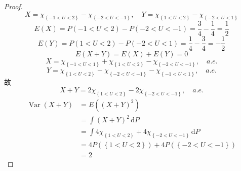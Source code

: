 \documentclass[../main.tex]{subfiles}
\begin{document}
\begin{proof}
  \[
  X=\chi _{\left\{ -1< U< 2 \right\}}- \chi _{\left\{ -2< U< -1 \right\}},\quad Y= \chi _{\left\{ 1< U< 2 \right\}}-\chi _{\left\{ -2< U< 1 \right\}}
  \]   \[
  E\left( X \right)=  P\left( -1< U< 2 \right)-P\left( -2< U< -1 \right)= \frac{3 }{4 }-\frac{1 }{4 }= \frac{1}{2}    
  \] \[
  E\left( Y \right)= P\left( 1< U< 2 \right)-P\left( -2< U< 1 \right)= \frac{1}{4}-\frac{3}{4}= -\frac{1}{2}   
  \]\[
  E\left( X+ Y \right)= E\left( X \right)+ E\left( Y \right)=    0
  \]\[
  X= \chi _{\left\{ -1< U< 1 \right\}}+ \chi _{\left\{ 1< U< 2 \right\}}-\chi _{\left\{ -2< U< -1 \right\}}, \quad a.e.
  \] \[
  Y= \chi _{\left\{ 1< U< 2 \right\}}-\chi_{\left\{ -2< U< -1 \right\}}- \chi _{\left\{ -1< U< 1 \right\}},\quad a.e.
  \] 故 \[
  X+ Y= 2\chi _{\left\{ 1< U< 2 \right\}}-2\chi _{\left\{ -2< U< -1 \right\}},\quad a.e.
  \]\[
  \begin{aligned}
  \operatorname{Var}\left( X+ Y \right)&=  E\left( \left( X+ Y \right)^{2} \right)\\ 
   &=   \int \left( X+ Y \right)^{2}\,\mathrm{d} P\\ 
    &= \int  4\chi _{\left\{ 1< U< 2 \right\}}+ 4\chi _{\left\{ -2< U< -1 \right\}}\,\mathrm{d} P\\ 
     &= 4P\left( \left\{ 1< U< 2 \right\} \right)+ 4P\left(\left\{  -2< U< -1 \right\} \right)  \\ 
      &= 2
  \end{aligned}
  \]
\end{proof}
\end{document}
